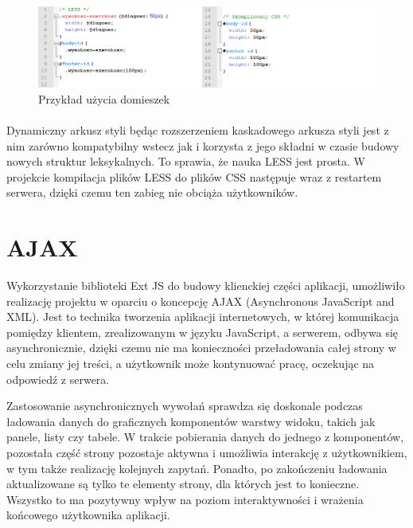 \begin{figure}[h]
	\centering
	\includegraphics[width=1.00\textwidth]{images/less2.png}
	\caption{Przykład użycia domieszek}
\end{figure}
\paragraph{}

Dynamiczny arkusz styli  będąc rozszerzeniem kaskadowego arkusza styli jest z nim zarówno kompatybilny wstecz jak i korzysta z jego składni w czasie budowy nowych struktur leksykalnych. To sprawia, że nauka LESS jest prosta.
W projekcie kompilacja plików LESS do plików CSS następuje wraz z restartem serwera, dzięki czemu ten zabieg nie obciąża użytkowników. \cite{LESS}


\section{AJAX}
Wykorzystanie biblioteki Ext JS do budowy klienckiej części aplikacji, umożliwiło realizację projektu w oparciu o koncepcję AJAX (Asynchronous JavaScript and XML). Jest to technika tworzenia aplikacji internetowych, w której komunikacja pomiędzy klientem, zrealizowanym w języku JavaScript, a serwerem, odbywa się asynchronicznie, dzięki czemu nie ma konieczności przeładowania całej strony w celu zmiany jej treści, a użytkownik może kontynuować pracę, oczekując na odpowiedź z serwera.\cite{ajaxWoj}

Zastosowanie asynchronicznych wywołań sprawdza się doskonale podczas ładowania danych do graficznych komponentów warstwy widoku, takich jak panele, listy czy tabele. W trakcie pobierania danych do jednego z komponentów, pozostała część strony pozostaje aktywna i umożliwia interakcję z użytkownikiem, w tym także realizację kolejnych zapytań. Ponadto, po zakończeniu ładowania aktualizowane są tylko te elementy strony, dla których jest to konieczne. Wszystko to ma pozytywny wpływ na poziom interaktywności i wrażenia końcowego użytkownika aplikacji.

